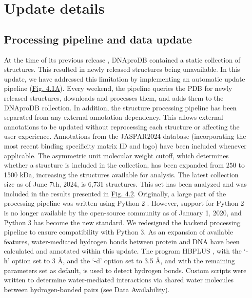 \section{Update details}

\subsection{Processing pipeline and data update}
At the time of its previous release \citep{Sagendorf2020}, DNAproDB contained a static collection of structures. This resulted in newly released structures being unavailable. In this update, we have addressed this limitation by implementing an automatic update pipeline (\hyperref[fig:dnaprodb1]{Fig. 4.1A}). Every weekend, the pipeline queries the PDB for newly released structures, downloads and processes them, and adds them to the DNAproDB collection. 
In addition, the structure processing pipeline has been separated from any external annotation dependency. This allows external annotations to be updated without reprocessing each structure or affecting the user experience. Annotations from the JASPAR2024 \citep{Rauluseviciute2024} database (incorporating the most recent binding specificity matrix ID and logo) have been included whenever applicable. 
The asymmetric unit molecular weight cutoff, which determines whether a structure is included in the collection, has been expanded from 250 to 1500 kDa, increasing the structures available for analysis. The latest collection size as of June 7th, 2024, is 6,731 structures. This set has been analyzed and was included in the results presented in \hyperref[fig:dnaprodb2]{Fig. 4.2}. 
Originally, a large part of the processing pipeline was written using Python 2 \citep{Guido1995}. However, support for Python 2 is no longer available by the open-source community as of January 1, 2020, and Python 3 \citep{Guido2009} has become the new standard. We redesigned the backend processing pipeline to ensure compatibility with Python 3. 
As an expansion of available features, water-mediated hydrogen bonds between protein and DNA have been calculated and annotated within this update. The program HBPLUS \citep{McDonald1994}, with the ‘-h’ option set to 3 \AA, and the ‘-d’ option set to 3.5 \AA, and with the remaining parameters set as default, is used to detect hydrogen bonds. Custom scripts were written to determine water-mediated interactions via shared water molecules between hydrogen-bonded pairs (see Data Availability).  


